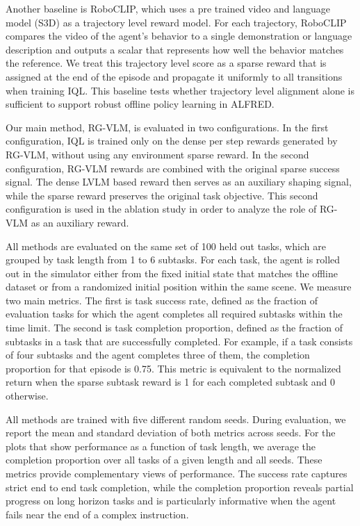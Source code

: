 \documentclass[master,english,final]{kaist-ucs}
\begin{document}
Another baseline is RoboCLIP\cite{sontakke2024roboclip}, which uses a pre trained video and language model (S3D\cite{xie2018rethinking}) as a trajectory level reward model. For each trajectory, RoboCLIP\cite{sontakke2024roboclip} compares the video of the agent’s behavior to a single demonstration or language description and outputs a scalar that represents how well the behavior matches the reference. We treat this trajectory level score as a sparse reward that is assigned at the end of the episode and propagate it uniformly to all transitions when training IQL\cite{wang2023implicit}. This baseline tests whether trajectory level alignment alone is sufficient to support robust offline policy learning in ALFRED.

Our main method, RG-VLM, is evaluated in two configurations. In the first configuration, IQL is trained only on the dense per step rewards generated by RG-VLM, without using any environment sparse reward. In the second configuration, RG-VLM rewards are combined with the original sparse success signal. The dense LVLM based reward then serves as an auxiliary shaping signal, while the sparse reward preserves the original task objective. This second configuration is used in the ablation study in order to analyze the role of RG-VLM as an auxiliary reward.

All methods are evaluated on the same set of 100 held out tasks, which are grouped by task length from 1 to 6 subtasks. For each task, the agent is rolled out in the simulator either from the fixed initial state that matches the offline dataset or from a randomized initial position within the same scene. We measure two main metrics. The first is task success rate, defined as the fraction of evaluation tasks for which the agent completes all required subtasks within the time limit. The second is task completion proportion, defined as the fraction of subtasks in a task that are successfully completed. For example, if a task consists of four subtasks and the agent completes three of them, the completion proportion for that episode is 0.75. This metric is equivalent to the normalized return when the sparse subtask reward is 1 for each completed subtask and 0 otherwise.

All methods are trained with five different random seeds. During evaluation, we report the mean and standard deviation of both metrics across seeds. For the plots that show performance as a function of task length, we average the completion proportion over all tasks of a given length and all seeds. These metrics provide complementary views of performance. The success rate captures strict end to end task completion, while the completion proportion reveals partial progress on long horizon tasks and is particularly informative when the agent fails near the end of a complex instruction.
\end{document}
